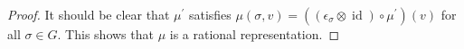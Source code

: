 \begin{proof}
  It should be clear that $\mu^\prime$ satisfies $ \mu \left( \sigma , v \right) = \left( \left( \epsilon_\sigma \otimes \operatorname{id} \right) \circ \mu^\prime \right) \left(v\right) $ for all $\sigma \in G$.
  This shows that $\mu$ is a rational representation.
  \end{proof}


